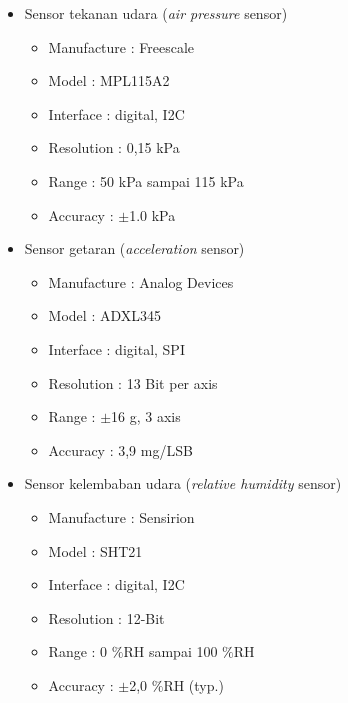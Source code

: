 \begin{itemize}
	\item Sensor tekanan udara (\textit{air pressure} sensor)
	\begin{itemize}
		\item Manufacture : Freescale
		\item Model : MPL115A2
		\item Interface : digital, I2C
		\item Resolution : 0,15 kPa
		\item Range : 50 kPa sampai 115 kPa
		\item Accuracy : $\pm$1.0 kPa
	\end{itemize}
\end{itemize}

\begin{itemize}
	\item Sensor getaran (\textit{acceleration} sensor)
	\begin{itemize}
		\item Manufacture : Analog Devices
		\item Model : ADXL345
		\item Interface : digital, SPI
		\item Resolution : 13 Bit per axis
		\item Range : $\pm$16 g, 3 axis
		\item Accuracy : 3,9 mg/LSB
	\end{itemize}
\end{itemize}

\begin{itemize}
	\item Sensor kelembaban udara (\textit{relative humidity} sensor)
	\begin{itemize}
		\item Manufacture : Sensirion
		\item Model : SHT21
		\item Interface : digital, I2C
		\item Resolution : 12-Bit
		\item Range : 0 $\%$RH sampai 100 $\%$RH
		\item Accuracy : $\pm$2,0 $\%$RH (typ.)
	\end{itemize}
\end{itemize}